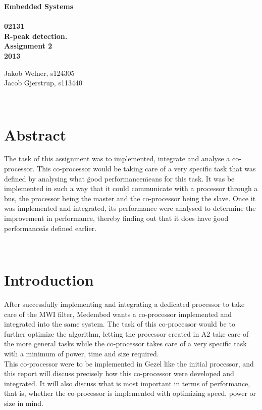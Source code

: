 \documentclass[12pt,a4paper]{article}
\begin{document}
\begin{titlepage}
	\begin{center}
		\vspace*{13\baselineskip}
		\huge
		\bfseries
		Embedded Systems\\ 
		\ \\
		02131 \\[5\baselineskip]

		\normalfont
		\Large
		R-peak detection. \\
		Assignment 2\\	
		2013

		\small
		\vfill
	\end{center}	
	\begin{flushleft}
		Jakob Welner, s124305\\
	 	Jacob Gjerstrup, s113440\\
	\end{flushleft}
\end{titlepage}

\ \\
\section*{Abstract}
The task of this assignment was to implemented, integrate and analyse a co-processor. This co-processor would be taking care of a very specific task that was defined by analysing what \"good performance\" means for this task. It was be implemented in such a way that it could communicate with a processor through a bus, the processor being the master and the co-processor being the slave. Once it was implemented and integrated, its performance were analysed to determine the improvement in performance, thereby finding out that it does have \"good performance\" as defined earlier.
\thispagestyle{empty} 
\newpage

\tableofcontents
\thispagestyle{empty} 
\newpage

\setcounter{page}{1}

\ \\
\section{Introduction}
	After successfully implementing and integrating a dedicated processor to take care of the MWI filter, Medembed wants a co-processor implemented and integrated into the same system. The task of this co-processor would be to further optimize the algorithm, letting the processor created in A2 take care of the more general tasks while the co-processor takes care of a very specific task with a minimum of power, time and size required.\\
	This co-processor were to be implemented in Gezel like the initial processor, and this report will discuss precisely how this co-processor were developed and integrated. It will also discuss what is most important in terms of performance, that is, whether the co-processor is implemented with optimizing speed, power or size in mind.\\
	
\end{document}
